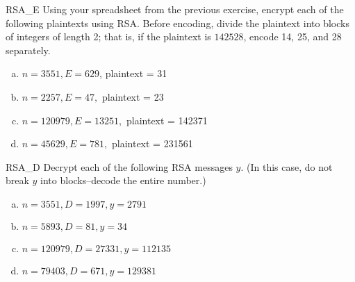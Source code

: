 \begin{exercise}{RSA_E}
Using your spreadsheet from the previous exercise, encrypt each of the following plaintexts using RSA. Before encoding, divide the plaintext
into blocks of integers of length 2;  that is, if the plaintext is $142528$, encode 
14, 25, and 28 separately.
 
\begin{enumerate}[(a)]
  \item
$n = 3551, E = 629$, plaintext = 31
 \item
$n = 2257, E = 47, $ plaintext  = 23
 \item
$n = 120979, E = 13251,$ plaintext = 142371
\item
$n = 45629, E = 781,$ plaintext = 231561
 
\end{enumerate}
\end{exercise}
 
\begin{exercise}{RSA_D}
Decrypt each of the following RSA messages $y$. (In this case, do not break $y$ into blocks--decode the entire number.)
 
 \begin{enumerate}[(a)]
\item
 $n = 3551, D = 1997, y = 2791$
 \item
$n = 5893, D = 81, y = 34$
 \item
$n = 120979, D = 27331, y = 112135$
 \item
$n = 79403, D = 671, y = 129381$
 \end{enumerate}
 \end{exercise}
 
% 
% 
% 
% 
% 
% 
% 
% 
% 
 
